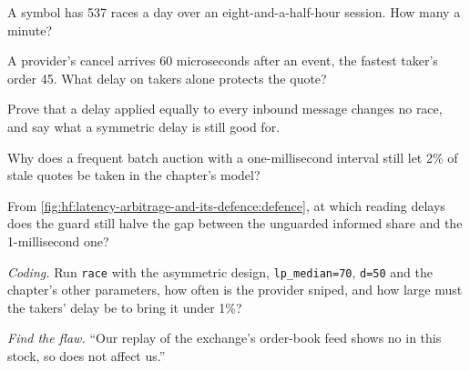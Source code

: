 \begin{exercise}[$\star$]\label{exo:hf:latency-arbitrage-and-its-defence:2}
A symbol has 537 races a day over an eight-and-a-half-hour session. How many a minute?
\end{exercise}

\begin{exercise}[$\star$]\label{exo:hf:latency-arbitrage-and-its-defence:3}
A provider's cancel arrives 60 microseconds after an event, the fastest taker's order 45. What delay on takers alone protects the quote?
\end{exercise}

\begin{exercise}[$\star\star$]\label{exo:hf:latency-arbitrage-and-its-defence:4}
Prove that a delay applied equally to every inbound message changes no race, and say what a symmetric delay is still good for.
\end{exercise}

\begin{exercise}[$\star\star$]\label{exo:hf:latency-arbitrage-and-its-defence:5}
Why does a frequent batch auction with a one-millisecond interval still let 2\% of stale quotes be taken in the chapter's model?
\end{exercise}

\begin{exercise}[$\star\star$]\label{exo:hf:latency-arbitrage-and-its-defence:6}
From \cref{fig:hf:latency-arbitrage-and-its-defence:defence}, at which reading delays does the guard still halve the gap between the unguarded
informed share and the 1-millisecond one?
\end{exercise}

\begin{exercise}[$\star\star\star$]\label{exo:hf:latency-arbitrage-and-its-defence:7}
\emph{Coding.} Run \texttt{race} with the asymmetric design, \texttt{lp\_median=70}, \texttt{d=50} and the chapter's other parameters, how often is the provider sniped, and how
large must the takers' delay be to bring it under 1\%?
\end{exercise}

\begin{exercise}[$\star\star\star$]\label{exo:hf:latency-arbitrage-and-its-defence:8}
\emph{Find the flaw.} ``Our replay of the exchange's order-book feed shows no  in this stock, so  does not affect us.''
\end{exercise}

